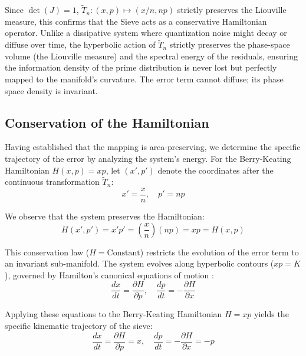 \documentclass[sn-mathphys-num, pdflatex]{sn-jnl}
\begin{document}
Since $\det(J) = 1$, $\tilde{T}_n: (x,p) \mapsto (x/n, np)$ strictly preserves the Liouville measure, this confirms that the Sieve acts as a conservative Hamiltonian operator. Unlike a dissipative system where quantization noise might decay or diffuse over time, the hyperbolic action of $\tilde{T}_n$ strictly preserves the phase-space volume (the Liouville measure) and the spectral energy of the residuals, ensuring the information density of the prime distribution is never lost but perfectly mapped to the manifold's curvature. The error term cannot diffuse; its phase space density is invariant.

\subsection{Conservation of the Hamiltonian}
\label{sec:hamiltonian}
Having established that the mapping is area-preserving, we determine the specific trajectory of the error by analyzing the system's energy. For the Berry-Keating Hamiltonian \cite{berry1999riemann} $H(x,p) = xp$, let $(x', p')$ denote the coordinates after the continuous transformation $\tilde{T}_n$:
\begin{equation}
x' = \frac{x}{n}, \quad p' = n p
\label{eq:transform_coords}
\end{equation}

We observe that the system preserves the Hamiltonian:
\begin{equation}
H(x', p') = x' p' = \left( \frac{x}{n} \right) (np) = xp = H(x, p)
\label{eq:H_const}
\end{equation}

This conservation law ($H = \text{Constant}$) restricts the evolution of the error term to an invariant sub-manifold. The system evolves along hyperbolic contours ($xp = K$), governed by Hamilton's canonical equations of motion \cite{arnold1989}:
\begin{equation}
\frac{dx}{dt} = \frac{\partial H}{\partial p}, \quad \frac{dp}{dt} = -\frac{\partial H}{\partial x}
\label{eq:ham_eqs}
\end{equation}

Applying these equations to the Berry-Keating Hamiltonian $H=xp$ \cite{berry1999riemann} yields the specific kinematic trajectory of the sieve:
\begin{equation}
\frac{dx}{dt} = \frac{\partial H}{\partial p} = x, \quad \frac{dp}{dt} = -\frac{\partial H}{\partial x} = -p
\label{eq:kinematic_traj}
\end{equation}
\end{document}
